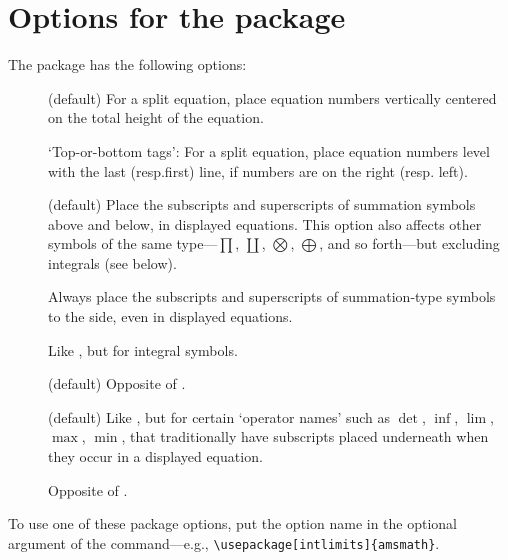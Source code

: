 \documentclass[leqno,titlepage,openany]{amsldoc}
\begin{document}
\section{Options for the  package}

The  package has the following options:
\begin{description}

\item[] (default) For a split equation, place equation
numbers vertically centered
on the total height of the equation.

\item[] `Top-or-bottom tags': For a split equation, place
equation numbers level with
the last (resp.\@ first) line, if numbers are on the right (resp.\@
left).

\item[] (default) Place the subscripts and
superscripts\relax
{} of summation symbols
above and below, in displayed equations. This option also affects other
symbols of the same type---$\prod$, $\coprod$, $\bigotimes$,
$\bigoplus$, and so forth---but excluding integrals (see below).

\item[] Always place the subscripts and superscripts of
summation-type symbols to the side, even in displayed equations.

\item[] Like , but for
integral symbols.

\item[] (default) Opposite of .

\item[] (default) Like , but for certain
`operator names' such as $\det$, $\inf$, $\lim$, $\max$, $\min$, that
traditionally have subscripts  placed underneath when they occur in a displayed
equation.

\item[] Opposite of .

\end{description}

To use one of these package options, put the option name in the optional
argument of the  command---e.g.,
\verb"\usepackage[intlimits]{amsmath}".
\end{document}
